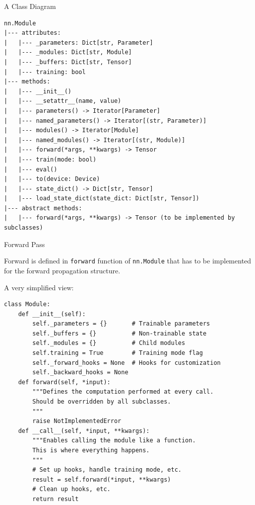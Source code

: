 \documentclass[aspectratio=169,xcolor=dvipsnames,svgnames,x11names,fleqn]{beamer}
\begin{document}
\begin{frame}[fragile]{A Class Diagram}

\begin{verbatim}
nn.Module
|--- attributes:
|   |--- _parameters: Dict[str, Parameter]
|   |--- _modules: Dict[str, Module]
|   |--- _buffers: Dict[str, Tensor]
|   |--- training: bool
|--- methods:
|   |--- __init__()
|   |--- __setattr__(name, value)
|   |--- parameters() -> Iterator[Parameter]
|   |--- named_parameters() -> Iterator[(str, Parameter)]
|   |--- modules() -> Iterator[Module]
|   |--- named_modules() -> Iterator[(str, Module)]
|   |--- forward(*args, **kwargs) -> Tensor
|   |--- train(mode: bool)
|   |--- eval()
|   |--- to(device: Device)
|   |--- state_dict() -> Dict[str, Tensor]
|   |--- load_state_dict(state_dict: Dict[str, Tensor])
|--- abstract methods:
|   |--- forward(*args, **kwargs) -> Tensor (to be implemented by subclasses)
\end{verbatim}

\end{frame}


\begin{frame}[fragile]{Forward Pass}

\small

Forward is defined in \texttt{forward} function of \texttt{nn.Module} that has to be implemented for the forward propagation structure.


A very simplified view:
\begin{verbatim}
class Module:
    def __init__(self):
        self._parameters = {}       # Trainable parameters
        self._buffers = {}          # Non-trainable state
        self._modules = {}          # Child modules
        self.training = True        # Training mode flag
        self._forward_hooks = None  # Hooks for customization
        self._backward_hooks = None
    def forward(self, *input):
        """Defines the computation performed at every call.
        Should be overridden by all subclasses.
        """
        raise NotImplementedError
    def __call__(self, *input, **kwargs):
        """Enables calling the module like a function.
        This is where everything happens.
        """
        # Set up hooks, handle training mode, etc.
        result = self.forward(*input, **kwargs)
        # Clean up hooks, etc.
        return result
\end{verbatim}

\end{frame}
\end{document}
